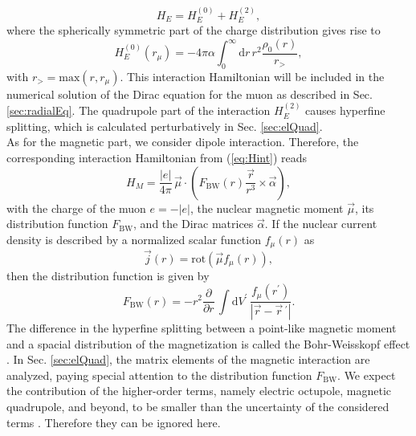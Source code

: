 \begin{equation}
\label{eq:quadInt}
H_E = H^{(0)}_E + H^{(2)}_E,
\end{equation}
where the spherically symmetric part of the charge distribution gives rise to
\begin{equation}
\label{eq:Hmonopole}
H^{(0)}_E(r_\mu)= - 4 \pi \alpha \int_0^\infty \mathrm{d}r \, r^2 \frac{\rho_0(r)}{r_>},
\end{equation}
with $r_>=\text{max}(r,r_\mu)$. This interaction Hamiltonian will be included in the numerical solution of the Dirac equation for the muon as described in Sec. \ref{sec:radialEq}. The quadrupole part of the interaction $H^{(2)}_E$ causes hyperfine splitting, which is calculated perturbatively in Sec. \ref{sec:elQuad}.\\

As for the magnetic part, we consider dipole interaction. Therefore, the corresponding interaction Hamiltonian from (\ref{eq:Hint}) reads \cite{Elizarov2005}
\begin{equation}
\label{eq:Hmag}
H_{M} = \frac{|e|}{4 \pi}\,\vec{\mu}\cdot \left( F_{\text{BW}}(r) \frac{\vec{r}}{r^3} \times \vec{\alpha} \right),
\end{equation}
with the charge of the muon $e=-|e|$, the nuclear magnetic moment $\vec{\mu}$, its distribution function $F_{\text{BW}}$, and the Dirac matrices $\vec{\alpha}$. If the nuclear current density is described by a normalized scalar function $f_\mu(r)$ as
\begin{equation}
\label{eq:currentdistr}
\vec{j}(r)= \text{rot}\left(\vec{\mu}f_\mu(r)\right),
\end{equation}
then the distribution function is given by
\begin{equation}
\label{eq:Fbw}
F_{\text{BW}}(r)=-r^2 \frac{\partial}{\partial r}\,\int \text{d}V^{\prime}\,\frac{f_\mu(r^{\prime})}{|\vec{r}-\vec{r}\,^{\prime}|}.
\end{equation}
The difference in the hyperfine splitting between a point-like magnetic moment and a spacial distribution of the magnetization is called the Bohr-Weisskopf effect \cite{bohrWeisskopf1950}. In Sec. \ref{sec:elQuad}, the matrix elements of the magnetic interaction are analyzed, paying special attention to the distribution function $F_{\text{BW}}$. We expect the contribution of the higher-order terms, namely electric octupole, magnetic quadrupole, and beyond, to be smaller than the uncertainty of the considered terms \cite{Devons1995,Steffen1985}. Therefore they can be ignored here.

